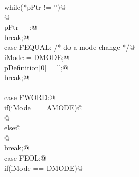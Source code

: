 \documentclass[12pt]{article}
\begin{document}
\begin{flushleft}
\begin{minipage}{\linewidth}
\begin{list}{}{}
\mbox{}\verb@                       while(*pPtr != '\n')@\\
\mbox{}@\\
\mbox{}\verb@                       pPtr++;@\\
\mbox{}\verb@                       break;@\\
\mbox{}\verb@           case FEQUAL: /* do a mode change */@\\
\mbox{}\verb@                       iMode = DMODE;@\\
\mbox{}\verb@                       pDefinition[0] = '\0';@\\
\mbox{}\verb@                       break;@\\
\mbox{}\verb@@\\
\mbox{}\verb@           case FWORD:@\\
\mbox{}\verb@                       if(iMode == AMODE)@\\
\mbox{}  @\\
\mbox{}\verb@                       else@\\
\mbox{}@\\
\mbox{}\verb@                       break;@\\
\mbox{}\verb@           case FEOL:@\\
\mbox{}\verb@                       if(iMode == DMODE)@\\

\end{list}
\end{minipage}
\end{flushleft}
\end{document}
